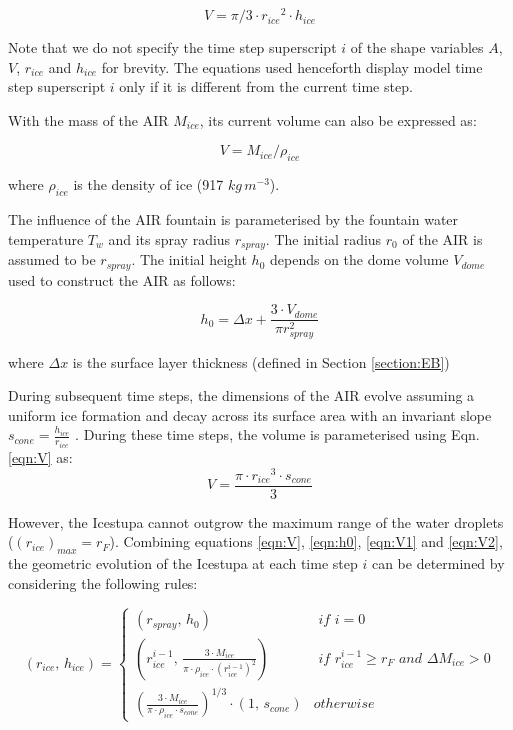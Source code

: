 \documentclass[utf8]{frontiersSCNS} %
\begin{document}
\begin{equation} V = \pi/3 \cdot {r_{ice}}^2 \cdot h_{ice} \label{eqn:V} \end{equation}

Note that we do not specify the time step superscript $i$ of the shape variables $A$, $V$, $r_{ice}$ and $h_{ice}$ for
brevity.  The equations used henceforth display model time step superscript $i$ only if it is different from the
current time step.

With the mass of the AIR $M_{ice}$, its current volume can also be expressed as: 

\begin{equation} V = M_{ice} /\rho_{ice} \label{eqn:V1} \end{equation} 

where $\rho_{ice}$ is the density of ice (917 $kg\, m^{-3}$). 


The influence of the AIR fountain is parameterised by the fountain water temperature $T_{w}$ and its spray radius $r_{spray}$.
The initial radius $r_0$ of the AIR is assumed to be $r_{spray}$. The initial height $h_0$ depends on the dome volume
$V_{dome}$ used to construct the AIR as follows:

\begin{equation} 
    h_{0} =  \Delta x + \frac{3 \cdot V_{dome}}{\pi r_{spray}^2 } 
\label{eqn:h0}
  \end{equation}

where $\Delta x$ is the surface layer thickness (defined in Section \ref{section:EB})

During subsequent time steps, the dimensions of the AIR evolve assuming a uniform ice formation and decay across
its surface area with an invariant slope $s_{cone} = \frac{h_{ice}}{r_{ice}}$ .  During
these time steps, the volume is parameterised using Eqn. \ref{eqn:V} as:\begin{equation} V = \frac{\pi \cdot {r_{ice}}^3
    \cdot s_{cone}}{3} \label{eqn:V2} \end{equation} 


However, the Icestupa cannot outgrow the maximum range of the water droplets ($(r_{ice})_{max} = r_{F}$). Combining
equations \ref{eqn:V}, \ref{eqn:h0}, \ref{eqn:V1} and \ref{eqn:V2}, the geometric evolution of the Icestupa at each time step $i$ can
be determined by considering the following rules:

\begin{equation} (r_{ice},\, h_{ice}) = \left\{ \begin{array}{ll} (r_{spray} ,\, h_0) & \textit{ if } i=0\\
    (r_{ice}^{i-1},\, \frac{3 \cdot M_{ice}}{\pi \cdot \rho_{ice} \cdot {(r_{ice}^{i-1})}^2}) & \textit{ if }
    r_{ice}^{i-1} \geq r_{F} \textit{ and } \Delta M_{ice} > 0 \\ (\frac{3 \cdot M_{ice}}{\pi \cdot \rho_{ice} \cdot s_{cone}})^{1/3} \cdot (1,\,  s_{cone}) &
otherwise \end{array} \right.  \label{eqn:A2} \end{equation}
\end{document}
